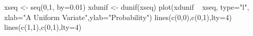 \begin{Schunk}
\begin{Sinput}
  xseq <- seq(0,1, by=0.01)
  xdunif <- dunif(xseq)
  plot(xdunif ~ xseq, type="l", xlab="A Uniform Variate",ylab="Probability")
  lines(c(0,0),c(0,1),lty=4)
  lines(c(1,1),c(0,1),lty=4)
\end{Sinput}
\end{Schunk}

